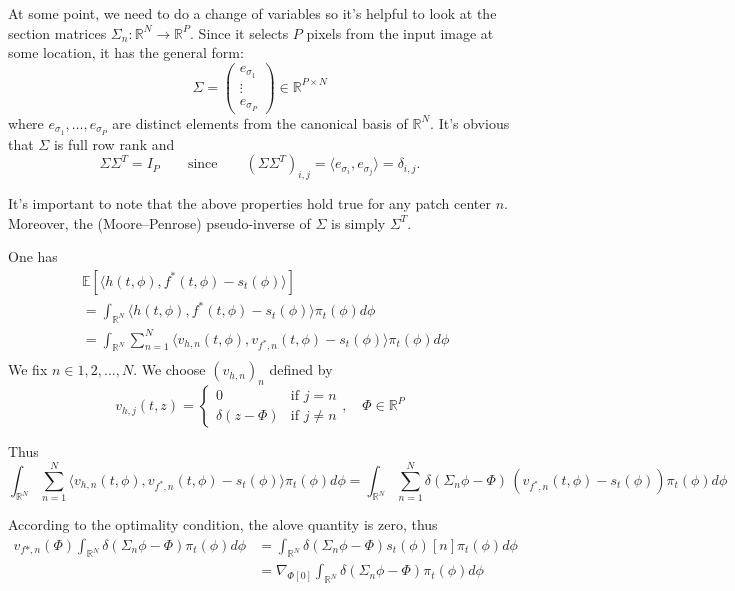 \documentclass[a4paper,10pt]{article}
\theoremstyle{definition} %
\theoremstyle{definition} %
\theoremstyle{definition} %
\theoremstyle{definition} %
\newcommand{\E}[1]{\mathbb{E}\left[#1\right]}
\newcommand{\R}{\mathbb{R}}
\begin{document}
At some point, we need to do a change of variables so it's helpful to look at the section matrices 
$\Sigma_n : \mathbb{R}^N \rightarrow \mathbb{R}^P$. 
Since it selects $P$ pixels from the input image at some location, it has the general form:
\[
\Sigma = 
\begin{pmatrix}
e_{\sigma_1} \\
\vdots \\
e_{\sigma_P}
\end{pmatrix}
\in \mathbb{R}^{P \times N}
\]
where $e_{\sigma_1}, \ldots, e_{\sigma_P}$ are distinct elements from the canonical basis of $\mathbb{R}^N$. 
It's obvious that $\Sigma$ is full row rank and
\[
\Sigma \Sigma^T = I_P \qquad \text{since} \qquad (\Sigma \Sigma^T)_{i,j} = \langle e_{\sigma_i}, e_{\sigma_j} \rangle = \delta_{i,j}.
\]

It's important to note that the above properties hold true for any patch center $n$. 
Moreover, the (Moore–Penrose) pseudo-inverse of $\Sigma$ is simply $\Sigma^T$.

One has
\begin{align*}
    & \E{\langle h(t,\phi),f^*(t,\phi) -s_t(\phi)\rangle} \\
    &= \int_{\R^N} \langle h(t,\phi),f^*(t,\phi)-s_t(\phi) \rangle \pi_t(\phi) d\phi\\
    &= \int_{\R^N} \sum_{n=1}^{N}\langle v_{h,n}(t,\phi),v_{f^*,n}(t,\phi)-s_t(\phi) \rangle \pi_t(\phi) d\phi\\
\end{align*}
We fix $n \in {1,2,\dots,N}$. We choose $(v_{h,n})_n$ defined by
\begin{equation*}
    v_{h,j}(t,z) = 
    \begin{cases}
        0 & \text{if } j = n \\
        \delta(z - \Phi) & \text{if } j \neq n
    \end{cases}
    ,\quad \Phi \in \R^P
\end{equation*}

Thus
\begin{equation*}
    \int_{\R^N} \sum_{n=1}^{N}\langle v_{h,n}(t,\phi),v_{f^*,n}(t,\phi)-s_t(\phi) \rangle \pi_t(\phi) d\phi =  \int_{\R^N} \sum_{n=1}^{N} \delta(\Sigma_n\phi -\Phi)\,(v_{f^*,n}(t,\phi)-s_t(\phi))  \pi_t(\phi) d\phi
\end{equation*}

According to the optimality condition, the alove quantity is zero, thus
\begin{align*}
    v_{f*,n}(\Phi)\int_{\R^N} \delta(\Sigma_n\phi -\Phi) \pi_t(\phi) d\phi &= \int_{\R^N} \delta(\Sigma_n\phi -\Phi) s_t(\phi)[n]\pi_t(\phi) d\phi \\
    &= \nabla_{\Phi[0]} \int_{\R^N} \delta(\Sigma_n\phi -\Phi) \pi_t(\phi) d\phi\\
\end{align*}
\end{document}

